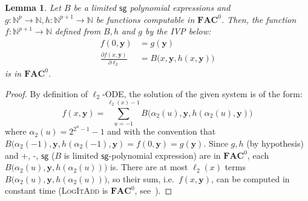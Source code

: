 \documentclass[11pt, oneside]{article}
\newcommand{\fun}[1]{\mathsf{#1}}
\newcommand{\sB}{B}
\newcommand{\Nat}{\mathbb{N}}
\newcommand{\AC}{\mathbf{FAC}}
\newcommand{\tu}[1]{\mathbf{#1}}
\newtheorem{lemma}{Lemma}
\theoremstyle{definition}
\begin{document}
\begin{toappendix}
%
%
\begin{lemma}\label{lemma:logitadd}
    Let $\sB$ be a limited $\fun{sg}$ polynomial expressions and $g:\Nat^{p} \to \Nat, h:\Nat^{p+1}\to \Nat$ be functions computable in $\AC^0$.
    Then, the function $f:\Nat^{p+1} \to \Nat$ defined from $\sB, h$ and $g$ by the IVP below:
    \begin{align*}
        f(0, \tu y) &= g(\tu y) \\
        \frac{\partial f(x, \tu y)}{\partial \ell_2} &= \sB\big(x, \tu y, h(x, \tu y)\big)
    \end{align*}
    is in $\AC^0$.
\end{lemma}
%
\begin{proof}
    By definition of $\ell_2$-ODE, the solution of the given system is of the form:
    $$
    f(x, \tu y) = \sum^{\ell_2(x)-1}_{u=-1} \sB\big(\alpha_2(u), \tu y, h(\alpha_2(u), \tu y)\big)
    $$
    where $\alpha_2(u)=2^{2^u-1}-1$ and with the convention that $\sB(\alpha_2(-1), \tu y, h(\alpha_2(-1), \tu y)=f(0, \tu y)= g(\tu y)$.
    Since $g, h$ (by hypothesis) and +, -, $\fun{sg}$ ($\sB$ is limited $\fun{sg}$-polynomial expression) are in $\AC^0$, each $\sB\big(\alpha_2(u), \tu y, h(\alpha_2(u))\big)$ is.
    There are at most $\ell_2(x)$ terms $\sB\big(\alpha_2(u), \tu y, h(\alpha_2(u))\big)$, so their sum, i.e.~$f(x, \tu y)$, can be computed in constant time (\textsc{LogItAdd} is $\AC^0$, see~\cite{Vollmer}). 
\end{proof}



\end{toappendix}
\end{document}

